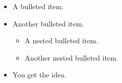 \documentclass[12pt]{article}
\begin{document}
\begin{itemize}
	\item  A  bulleted  item.
	\item  Another  bulleted  item.
		\begin{itemize}
		\item  A  nested  bulleted  item.
		\item  Another  nested  bulleted  item.
		\end{itemize}
	\item  You  get  the  idea.
	\end{itemize}
\end{document}
